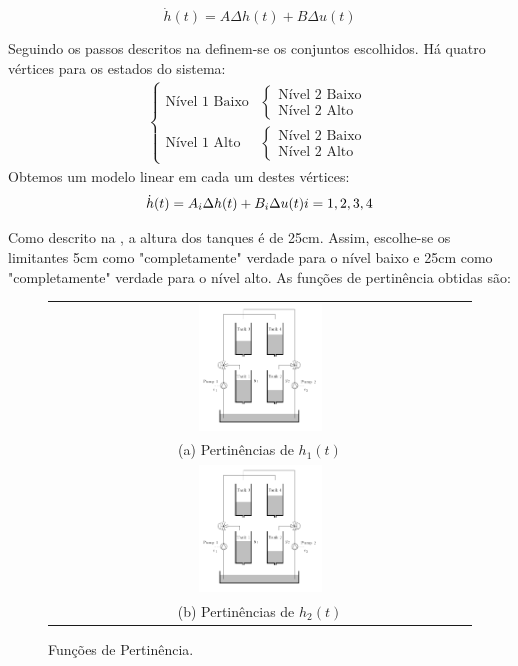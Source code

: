 	\begin{equation}
		\dot{h}(t) =  A \Delta h(t) +  B \Delta u(t)
	\end{equation}

Seguindo os passos descritos na  definem-se os conjuntos escolhidos. Há quatro vértices para os estados do sistema:
\begin{align}
	\begin{cases}
		\text{Nível 1 Baixo}
		&\begin{cases}
			\text{Nível 2 Baixo}\\
			\text{Nível 2 Alto}
		\end{cases}	\\
		\text{Nível 1 Alto}
		&\begin{cases}
			\text{Nível 2 Baixo}\\
			\text{Nível 2 Alto}
		\end{cases}
	\end{cases}
\end{align}
Obtemos um modelo linear em cada um destes vértices:
	\begin{equation}
	\dot{h}(t) =  A_i \Delta h(t) +  B_i \Delta u(t) \\
	i = 1,2,3,4
	\end{equation}


Como descrito na , a altura dos tanques é de 25cm. Assim, escolhe-se os limitantes 5cm como "completamente" verdade para o nível baixo e  25cm como "completamente" verdade para o nível alto. As funções de pertinência obtidas são:

\begin{figure}[H]
	\centering
	\begin{tabular}{c}
		\includegraphics[width=0.3\textwidth,keepaspectratio]{img/4tank.png}\\
		(a) Pertinências de $h_1(t)$ \\
		\includegraphics[width=0.3\textwidth,keepaspectratio]{img/4tank.png} \\
		(b) Pertinências de $h_2(t)$ \\
	\end{tabular}
	\caption{\label{figPertMod} Funções de Pertinência.}
\end{figure}

